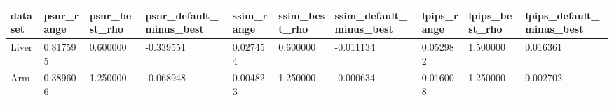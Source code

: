 \begin{tabular}{llllllllll}
dataset & psnr\_range & psnr\_best\_rho & psnr\_default\_minus\_best & ssim\_range & ssim\_best\_rho & ssim\_default\_minus\_best & lpips\_range & lpips\_best\_rho & lpips\_default\_minus\_best \\
\hline
Liver & 0.817595 & 0.600000 & -0.339551 & 0.027454 & 0.600000 & -0.011134 & 0.052982 & 1.500000 & 0.016361 \\
Arm & 0.389606 & 1.250000 & -0.068948 & 0.004823 & 1.250000 & -0.000634 & 0.016008 & 1.250000 & 0.002702 \\
\end{tabular}
